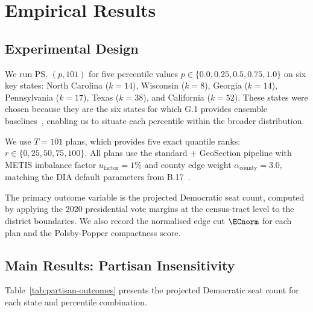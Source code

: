 \section{Empirical Results}
\label{sec:results}

\subsection{Experimental Design}

We run \ps{}$(p, 101)$ for five percentile values $p \in \{0.0, 0.25, 0.5,
0.75, 1.0\}$ on six key states: North Carolina ($k = 14$), Wisconsin ($k = 8$),
Georgia ($k = 14$), Pennsylvania ($k = 17$), Texas ($k = 38$), and
California ($k = 52$).
These states were chosen because they are the six states for which G.1
provides \gc{} ensemble baselines~\citep{g1paper}, enabling us to situate
each percentile within the broader \recom{} distribution.

We use $T = 101$ plans, which provides five exact quantile ranks:
$r \in \{0, 25, 50, 75, 100\}$.
All plans use the standard \ar{} + GeoSection pipeline with METIS imbalance
factor $u_{\mathrm{factor}} = 1\%$ and county edge weight
$\alpha_{\mathrm{county}} = 3.0$, matching the DIA default parameters from
B.17~\citep{b17paper}.

The primary outcome variable is the projected Democratic seat count, computed
by applying the 2020 presidential vote margins at the census-tract level to
the district boundaries.
We also record the normalised edge cut $\ECnorm$ for each plan and the
Polsby-Popper compactness score.

\subsection{Main Results: Partisan Insensitivity}

Table~\ref{tab:partisan-outcomes} presents the projected Democratic seat
count for each state and percentile combination.

